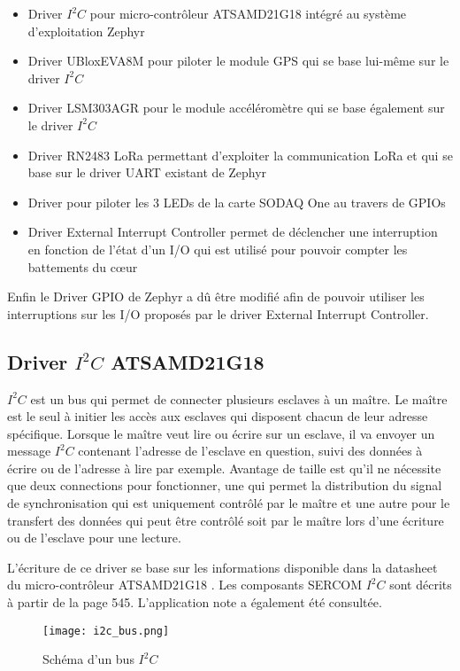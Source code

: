 \begin{itemize}
\item Driver $I^{2}C$ pour micro-contrôleur ATSAMD21G18 intégré au système d'exploitation Zephyr
\item Driver UBloxEVA8M pour piloter le module GPS qui se base lui-même sur le driver $I^{2}C$
\item Driver LSM303AGR pour le module accéléromètre qui se base également sur le driver  $I^{2}C$
\item Driver RN2483 LoRa permettant d'exploiter la communication LoRa et qui se base sur le driver UART existant de Zephyr
\item Driver pour piloter les 3 LEDs de la carte SODAQ One au travers de GPIOs
\item Driver External Interrupt Controller permet de déclencher une interruption en fonction de l'état d'un I/O qui est utilisé pour pouvoir compter les battements du cœur
\end{itemize}

Enfin le Driver GPIO de Zephyr a dû être modifié afin de pouvoir utiliser les interruptions sur les I/O proposés par le driver External Interrupt Controller.

\subsection{Driver $I^{2}C$ ATSAMD21G18}

$I^{2}C$ est un bus qui permet de connecter plusieurs esclaves à un maître. Le maître est le seul à initier les accès aux esclaves qui disposent chacun de leur adresse spécifique. Lorsque le maître veut lire ou écrire sur un esclave, il va envoyer un message $I^{2}C$ contenant l'adresse de l'esclave en question, suivi des données à écrire ou de l'adresse à lire par exemple. Avantage de taille est qu'il ne nécessite que deux connections pour fonctionner, une qui permet la distribution du signal de synchronisation qui est uniquement contrôlé par le maître et une autre pour le transfert des données qui peut être contrôlé soit par le maître lors d'une écriture ou de l'esclave pour une lecture.

L'écriture de ce driver se base sur les informations disponible dans la datasheet du micro-contrôleur ATSAMD21G18 \cite{samd21-datasheet}. Les composants SERCOM $I^{2}C$ sont décrits à partir de la page 545. L'application note \cite{samd21-i2c-configuration} a également été consultée.

\begin{figure}[htb]
\centering 
\texttt{[image: i2c\_bus.png]} 
\caption{Schéma d'un bus $I^{2}C$}
\label{fig:i2c_bus}
\end{figure}

